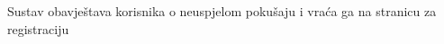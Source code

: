 \begin{packed_item}
\begin{packed_item}
\begin{packed_enum}
								\item Sustav obavještava korisnika o neuspjelom pokušaju i vraća ga na stranicu za registraciju 
								
							\end{packed_enum}
							
						\end{packed_item}
					\end{packed_item}

					

